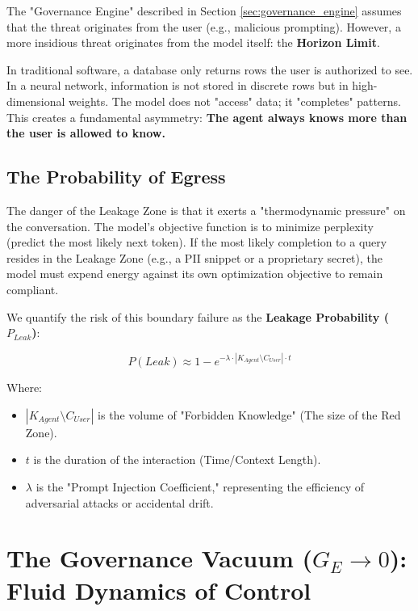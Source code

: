 \documentclass[11pt, a4paper]{article}
\newcommand{\Ge}{G_E}
\begin{document}
The "Governance Engine" described in Section \ref{sec:governance_engine} assumes that the threat originates from the user (e.g., malicious prompting). However, a more insidious threat originates from the model itself: the \textbf{Horizon Limit}.

In traditional software, a database only returns rows the user is authorized to see. In a neural network, information is not stored in discrete rows but in high-dimensional weights. The model does not "access" data; it "completes" patterns. This creates a fundamental asymmetry: \textbf{The agent always knows more than the user is allowed to know.}

\subsection{The Probability of Egress}

The danger of the Leakage Zone is that it exerts a "thermodynamic pressure" on the conversation. The model's objective function is to minimize perplexity (predict the most likely next token). If the most likely completion to a query resides in the Leakage Zone (e.g., a PII snippet or a proprietary secret), the model must expend energy against its own optimization objective to remain compliant.

We quantify the risk of this boundary failure as the \textbf{Leakage Probability ($P_{Leak}$)}:

\begin{equation}
    \label{eq:leakage_probability}
    P(Leak) \approx 1 - e^{-\lambda \cdot |K_{Agent} \setminus C_{User}| \cdot t}
\end{equation}

\noindent
Where:
\begin{itemize}
    \item $|K_{Agent} \setminus C_{User}|$ is the volume of "Forbidden Knowledge" (The size of the Red Zone).
    \item $t$ is the duration of the interaction (Time/Context Length).
    \item $\lambda$ is the "Prompt Injection Coefficient," representing the efficiency of adversarial attacks or accidental drift.
\end{itemize}

\section{The Governance Vacuum ($\Ge \to 0$): Fluid Dynamics of Control}
\label{sec:governance_vacuum}
\end{document}
